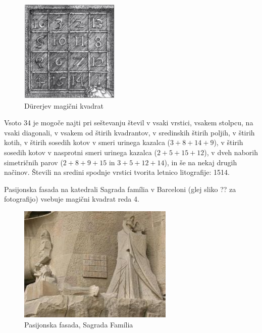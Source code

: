 \documentclass[a4paper,12pt]{article}
\begin{document}
\begin{figure}[!ht]
   \centering
   \includegraphics[scale=1.3]{durer.png}
   \caption{Dürerjev magični kvadrat}
   \label{fig:durer}
 \end{figure}
 


Vsoto 34 je mogoče najti pri seštevanju števil v vsaki vrstici, vsakem stolpcu,
na vsaki diagonali, v vsakem od štirih kvadrantov, v sredinskih štirih poljih,
v štirih kotih, v štirih sosedih kotov v smeri urinega kazalca ($3+8+14+9$), v
štirih sosedih kotov v nasprotni smeri urinega kazalca ($2+5+15+12$), v dveh naborih
simetričnih parov ($2+8+9+15$ in $3+5+12+14$), in še na nekaj drugih načinov.
Števili na sredini spodnje vrstici tvorita letnico litografije: 1514.
%

Pasijonska fasada na katedrali Sagrada família v Barceloni
(glej sliko ?? za fotografijo) vsebuje magični kvadrat reda 4.

\begin{figure}[!ht]
   \centering
   \includegraphics{sagrada.png}
   \caption{Pasijonska fasada, Sagrada Família}
   \label{fig:sagrada}
 \end{figure}
\end{document}
